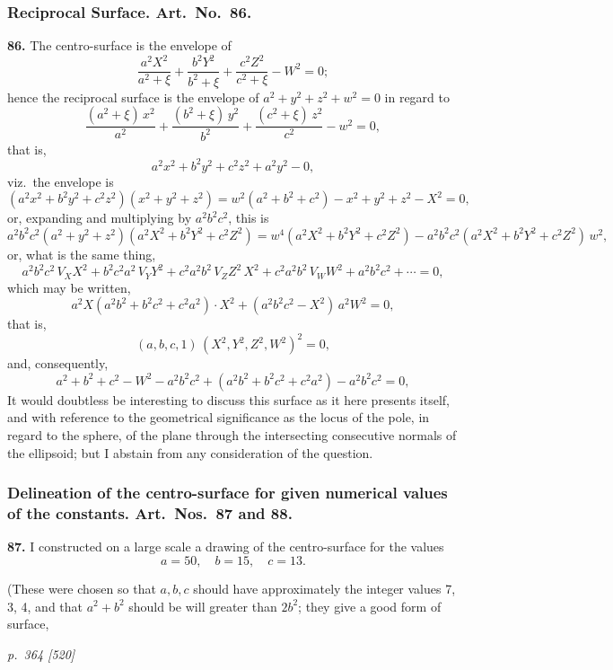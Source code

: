 \documentclass[11pt,a4paper]{book}
\begin{document}
\subsubsection*{Reciprocal Surface. Art.\ No.\ 86.}

\textbf{86.} The centro-surface is the envelope of
\[
\frac{a^2 X^2}{a^2 + \xi} + \frac{b^2 Y^2}{b^2 + \xi} + \frac{c^2 Z^2}{c^2 + \xi} - W^2 = 0;
\]
hence the reciprocal surface is the envelope of $a^2 + y^2 + z^2 + w^2 = 0$ in regard to
\[
\frac{(a^2 + \xi)\,x^2}{a^2}+\frac{(b^2 + \xi)\,y^2}{b^2}+\frac{(c^2 + \xi)\,z^2}{c^2} - w^2 = 0,
\]
that is,
\[
a^2 x^2 + b^2 y^2 + c^2 z^2 + a^2 y^2 - 0,
\]
viz.\ the envelope is
\[
(a^2 x^2 + b^2 y^2 + c^2 z^2)(x^2 + y^2 + z^2) = w^2 (a^2 + b^2 + c^2) - x^2 + y^2 + z^2 - X^2 = 0,
\]
or, expanding and multiplying by $a^2 b^2 c^2$, this is
\[
a^2 b^2 c^2 (a^2 + y^2 + z^2)(a^2 X^2 + b^2 Y^2 + c^2 Z^2) = w^4 (a^2 X^2 + b^2 Y^2 + c^2 Z^2) - a^2 b^2 c^2 (a^2 X^2 + b^2 Y^2 + c^2 Z^2)\,w^2,
\]
or, what is the same thing,
\[
a^2 b^2 c^2 \,V_X X^2 + b^2 c^2 a^2 \,V_Y Y^2 + c^2 a^2 b^2 \,V_Z Z^2 \,X^2 + c^2 a^2 b^2 \,V_W W^2 + a^2 b^2 c^2 + \cdots = 0,
\]
which may be written,
\[
a^2 X(a^2 b^2 + b^2 c^2 + c^2 a^2) \cdot X^2 + (a^2 b^2 c^2 - X^2)\,a^2 W^2 = 0,
\]
that is,
\[
(a, b, c, 1)\,(X^2, Y^2, Z^2, W^2)^2 = 0,
\]
and, consequently,
\[
a^2 + b^2 + c^2 - W^2 - a^2 b^2 c^2 + (a^2 b^2 + b^2 c^2 + c^2 a^2) - a^2 b^2 c^2 = 0,
\]
It would doubtless be interesting to discuss this surface as it here presents itself,
and with reference to the geometrical significance as the locus of the pole, in regard to the sphere, of the plane through the intersecting consecutive normals of the ellipsoid; but I abstain from any consideration of the question.

\subsubsection*{Delineation of the centro-surface for given numerical values of the constants. Art.\ Nos.\ 87 and 88.}

\textbf{87.} I constructed on a large scale a drawing of the centro-surface for the values
\[
a = 50,\quad b = 15,\quad c = 13.
\]

(These were chosen so that $a, b, c$ should have approximately the integer values 7, 3, 4, and that $a^2 + b^2$ should be will greater than $2b^2$; they give a good form of surface,

\clearpage

\bigskip
\textit{p.~364 [520]}
\smallskip
\end{document}
